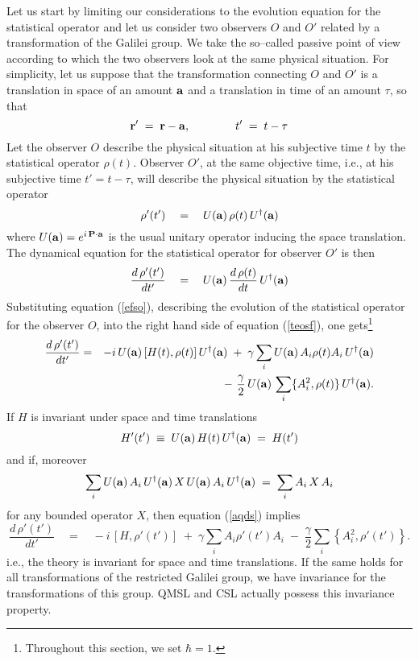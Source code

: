 \documentclass[10pt,a4paper]{article}
\begin{document}
Let us start by limiting our considerations to the evolution
equation for the statistical operator and let us consider two
observers $O$ and $O'$ related by a transformation of the Galilei
group. We take the so--called passive point of view according to
which the two observers look at the same physical situation. For
simplicity, let us suppose that the transformation connecting $O$
and $O'$ is a translation in space of an amount ${\bf a}$ and a
translation in time of an amount $\tau$, so that
\begin{equation} \label{qdelg}
{\bf r}' \; = \; {\bf r} - {\bf a}, \qquad\qquad t'\; = \; t -
\tau
\end{equation}
Let the observer $O$ describe the physical situation at his
subjective time $t$ by the statistical operator $\rho(t)$.
Observer $O'$, at the same objective time, i.e., at his subjective
time $t' = t - \tau$, will describe the physical situation by the
statistical operator
\begin{equation}
\rho'(t')\quad = \quad U({\bf a})\, \rho(t)\, U^{\dagger}({\bf a})
\end{equation}
where $U({\bf a}) = e^{i\,{\bf P}\cdot {\bf a}}$ is the usual
unitary operator inducing the space translation. The dynamical
equation for the statistical operator for observer $O'$ is then
\begin{equation} \label{teosf}
\frac{d\, \rho'(t')}{dt'} \quad = \quad U({\bf a})\, \frac{d\,
\rho(t)}{dt}\, U^{\dagger}({\bf a})
\end{equation}
Substituting equation (\ref{efso}), describing the evolution of
the statistical operator for the observer $O$, into the right hand
side of equation (\ref{teosf}), one gets\footnote{Throughout this
section, we set $\hbar = 1$.}
\begin{eqnarray} \label{aqds}
\frac{d\, \rho'(t')}{dt'} & = & - i\, U({\bf a})\, [H(t),
\rho(t)]\, U^{\dagger}({\bf a}) \; + \; \gamma \sum_{i} U({\bf
a})\, A_{i} \rho(t) A_{i}\, U^{\dagger}({\bf a}) \nonumber
\\
& & -\ \frac{\gamma}{2}\, U({\bf a})\, \sum_{i} \{ A_{i}^{2},
\rho(t)\} \, U^{\dagger}({\bf a}).
\end{eqnarray}
If $H$ is invariant under space and time translations
\begin{equation}
H'(t') \; \equiv \; U({\bf a})\, H(t)\, U^{\dagger}({\bf a})\; =
\; H(t')
\end{equation}
and if, moreover
\begin{equation}
\sum_{i} U({\bf a})\, A_{i}\, U^{\dagger}({\bf a})\, X\, U({\bf
a})\, A_{i}\, U^{\dagger}({\bf a}) \; = \; \sum_{i} A_{i}\, X\,
A_{i}
\end{equation}
for any bounded operator $X$, then equation (\ref{aqds}) implies
\begin{equation} \label{gtlr}
\frac{d\, \rho'(t')}{dt'} \quad = \quad -i\, [H, \rho'(t')] \; +
\; \gamma \sum_{i} A_{i} \rho'(t') A_{i} \; - \; \frac{\gamma}{2}
\sum_{i} \left\{ A_{i}^{2}, \rho'(t') \right\}.
\end{equation}
i.e., the theory is invariant for space and time translations. If
the same holds for all transformations of the restricted Galilei
group, we have invariance for the transformations of this group.
QMSL and CSL actually possess this invariance property.
\end{document}
